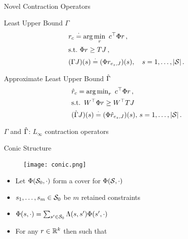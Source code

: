 \documentclass[10pt]{beamer}
\begin{document}
\begin{frame}[fragile]{Novel Contraction Operators}
\begin{block}{Least Upper Bound $\Gamma$}
\begin{align*}
\begin{split}
&r_c\eqdef\arg\min_{r} \,\, c^\top \Phi r\,,\\
&\text{s.t.} \mb \Phi r\geq  TJ\,,\\
&(\Gamma J)(s)\eqdef(\Phi r_{e_s,J})(s),\quad s=1,\ldots,|\S|\,.
\end{split}
\end{align*}
\end{block}

\begin{block}{Approximate Least Upper Bound $\hg$}
\begin{align*}
&\hat{r}_c={\arg\min}_{r} \,\mb c^\top \Phi r\,,\\
&\text{s.t.} \,\,\, W^\top  \Phi r\geq W^\top TJ\,\\
&(\hg J)(s)\eqdef(\Phi \hr_{e_s,J})(s),\, s=1,\ldots,|\S|\,.
\end{align*}
\end{block}

\begin{block}{$\Gamma$ and $\hg$: $L_\infty$ contraction operators}

\end{block}

\end{frame}

\begin{frame}[fragile]{Conic Structure}
\begin{figure}
\texttt{[image: conic.png]}
\end{figure}
\begin{block}{}
\begin{itemize}
\item Let $\Phi(\S_0,\cdot)$ form a {\color{orange}{conic}} cover for $\Phi(\S,\cdot)$
\item $s_1,\ldots,s_m\in \S_0$ be $m$ retained constraints
\item $\Phi(s,\cdot)=\sum_{s'\in \S_0}\Lambda(s,s')\Phi(s',\cdot)$
\item For any $r\in \R^k$ {\color{orange}{$\Phi(s,\cdot) r<0$}} then {\color{orange}{$\exists s'\in \S_0$}} such that {\color{orange}{$\Phi(s',\cdot) r<0$}}
\end{itemize}
\end{block}

\end{frame}
\end{document}
